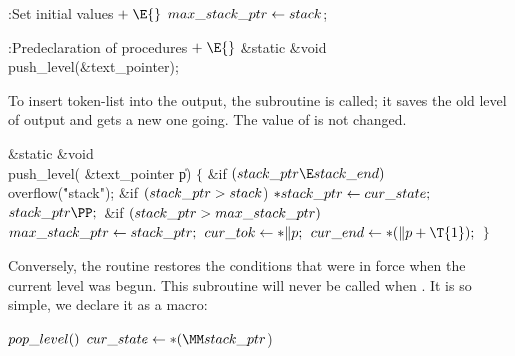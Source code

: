 \B{}:Set initial values\X${}\mathrel+\E{}$\6
$\\{max\_stack\_ptr}\leftarrow\\{stack}{}$;\par
\fi

\B{}:Predeclaration of procedures\X${}\mathrel+\E{}$\6
\&{static} \&{void} \\{push\_level}(\&{text\_pointer});\par
\fi

To insert token-list  into the output, the 
subroutine
is called; it saves the old level of output and gets a new one going.
The value of  is not changed.

\Y\B\1\1\&{static} \&{void} \\{push\_level}(\6
\&{text\_pointer} \|p)\2\2\6
${}\{{}$\1\6
\&{if} ${}(\\{stack\_ptr}\E\\{stack\_end}){}$\1\5
\\{overflow}(\.{"stack"});\2\6
\&{if} ${}(\\{stack\_ptr}>\\{stack}{}$)\1\6
${}{*}\\{stack\_ptr}\leftarrow\\{cur\_state};{}$\2\6
${}\\{stack\_ptr}\PP;{}$\6
\&{if} ${}(\\{stack\_ptr}>\\{max\_stack\_ptr}){}$\1\5
${}\\{max\_stack\_ptr}\leftarrow\\{stack\_ptr};{}$\2\6
${}\\{cur\_tok}\leftarrow{*}\|p;{}$\6
${}\\{cur\_end}\K{*}(\|p+\T{1});{}$\6
\4${}\}{}$\2\par
\fi

Conversely, the  routine restores the conditions that
were in
force when the current level was begun. This subroutine will never be
called when . It is so simple, we declare it as a
macro:

\Y\B\4\D$\\{pop\_level}()$ \5
$\\{cur\_state}\K{*}(\MM\\{stack\_ptr}{}$)\par
\fi

